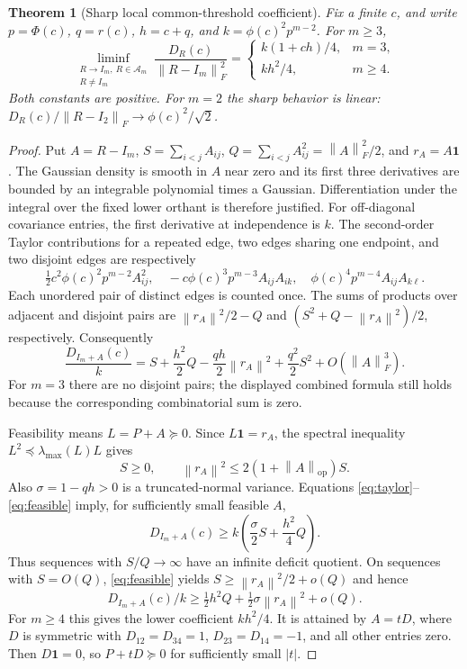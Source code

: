 \documentclass[11pt]{article}
\newtheorem{theorem}{Theorem}
\theoremstyle{remark}\newtheorem{remark}[theorem]{Remark}
\newcommand{\R}{\mathbb R}
\newcommand{\one}{\mathbf 1}
\newcommand{\norm}[1]{\left\lVert#1\right\rVert}
\begin{document}
\begin{theorem}[Sharp local common-threshold coefficient]\label{thm:local}
Fix a finite $c$, and write $p=\Phi(c)$, $q=r(c)$, $h=c+q$, and
$k=\phi(c)^2p^{m-2}$. For $m\ge3$,
\begin{equation}\label{eq:sharp}
 \liminf_{\substack{R\to I_m,\ R\in\mathcal A_m\\R\ne I_m}}
   \frac{D_R(c)}{\norm{R-I_m}_F^2}
 =\begin{cases}
    k(1+ch)/4,&m=3,\\
    kh^2/4,&m\ge4.
   \end{cases}
\end{equation}
Both constants are positive. For $m=2$ the sharp behavior is linear:
$D_R(c)/\norm{R-I_2}_F\to\phi(c)^2/\sqrt2$.
\end{theorem}
\begin{proof}
Put $A=R-I_m$, $S=\sum_{i<j}A_{ij}$,
$Q=\sum_{i<j}A_{ij}^2=\norm A_F^2/2$, and $r_A=A\one$.
The Gaussian density is smooth in $A$ near zero and its first three derivatives
are bounded by an integrable polynomial times a Gaussian. Differentiation
under the integral over the fixed lower orthant is therefore justified.
For off-diagonal covariance entries, the first derivative at independence is
$k$. The second-order Taylor contributions for a repeated edge, two edges
sharing one endpoint, and two disjoint edges are respectively
\[
 \tfrac12 c^2\phi(c)^2p^{m-2}A_{ij}^2,\quad
 -c\phi(c)^3p^{m-3}A_{ij}A_{ik},\quad
 \phi(c)^4p^{m-4}A_{ij}A_{k\ell}.
\]
Each unordered pair of distinct edges is counted once. The sums of products
over adjacent and disjoint pairs are
$\norm{r_A}^2/2-Q$ and $(S^2+Q-\norm{r_A}^2)/2$, respectively.
Consequently
\begin{equation}\label{eq:taylor}
 \frac{D_{I_m+A}(c)}k
 =S+\frac{h^2}{2}Q-\frac{qh}{2}\norm{r_A}^2
       +\frac{q^2}{2}S^2+O(\norm A_F^3).
\end{equation}
For $m=3$ there are no disjoint pairs; the displayed combined formula still
holds because the corresponding combinatorial sum is zero.

Feasibility means $L=P+A\succeq0$. Since $L\one=r_A$, the spectral inequality
$L^2\preceq\lambda_{\max}(L)L$ gives
\begin{equation}\label{eq:feasible}
 S\ge0,\qquad \norm{r_A}^2\le2(1+\norm A_{\mathrm{op}})S.
\end{equation}
Also $\sigma=1-qh>0$ is a truncated-normal variance.
Equations \eqref{eq:taylor}--\eqref{eq:feasible} imply, for sufficiently small
feasible $A$,
\[
 D_{I_m+A}(c)\ge k\left(\frac\sigma2 S+\frac{h^2}{4}Q\right).
\]
Thus sequences with $S/Q\to\infty$ have an infinite deficit quotient.
On sequences with $S=O(Q)$, \eqref{eq:feasible} yields
$S\ge\norm{r_A}^2/2+o(Q)$ and hence
\begin{equation}\label{eq:local-lower}
 D_{I_m+A}(c)/k\ge\tfrac12 h^2Q
                       +\tfrac12\sigma\norm{r_A}^2+o(Q).
\end{equation}
For $m\ge4$ this gives the lower coefficient $kh^2/4$.
It is attained by $A=tD$, where $D$ is symmetric with
$D_{12}=D_{34}=1$, $D_{23}=D_{14}=-1$, and all other entries zero.
Then $D\one=0$, so $P+tD\succeq0$ for sufficiently small $|t|$.


\end{proof}
\end{document}
